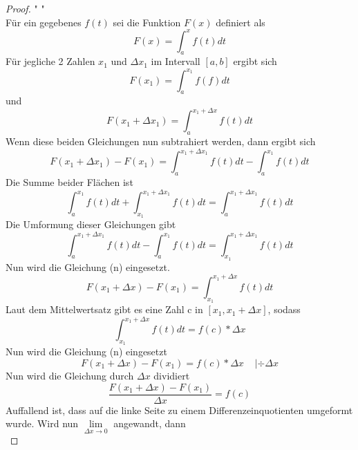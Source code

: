 \documentclass[fontsize=12pt,paper=a4,DIV12,cleardoublepage=empty, 
liststotoc,idxtotoc,bibtotoc]{article}
\theoremstyle{plain}
\theoremstyle{definition}
\begin{document}
	
	\begin{proof}" "\\
	
		Für ein gegebenes $f(t)$ sei die Funktion $F(x)$ definiert als
		\begin{equation}
			F(x)=\int_{a}^{x}f(t)dt
		\end{equation}
		Für jegliche 2 Zahlen $x_1$ und $\Delta x_1$ im Intervall $[a, b]$ ergibt sich
		\begin{equation}
			F(x_1)=\int_{a}^{x_1}f(f)dt
		\end{equation}
		und
		\begin{equation}
			F(x_1+\Delta x_1)=\int_{a}^{x_1+\Delta x}f(t)dt
		\end{equation}
		Wenn diese beiden Gleichungen nun subtrahiert werden, dann ergibt sich
		\begin{equation}
			F(x_1+\Delta x_1)-F(x_1)=\int_{a}^{x_1+\Delta x_1}f(t)dt-\int_{a}^{x_1}f(t)dt
		\end{equation}
		Die Summe beider Flächen ist
		\begin{equation}
			\int_{a}^{x_1}f(t)dt + \int_{x_1}^{x_1+\Delta x_1}f(t)dt = \int_{a}^{x_1+\Delta x_1}f(t)dt
		\end{equation}
		Die Umformung dieser Gleichungen gibt
		\begin{equation}
			\int_{a}^{x_1+\Delta x_1}f(t)dt-\int_{a}^{x_1}f(t)dt=\int_{x_1}^{x_1+\Delta x_1}f(t)dt
		\end{equation}
		Nun wird die Gleichung (n) eingesetzt.
		\begin{equation}
			F(x_1+\Delta x)-F(x_1)=\int_{x_1}^{x_1+\Delta x}f(t)dt
		\end{equation}
		Laut dem Mittelwertsatz gibt es eine Zahl c in $[x_1, x_1+\Delta x]$, sodass
		\begin{equation}
			\int_{x_1}^{x_1+\Delta x}f(t)dt=f(c)*\Delta x
		\end{equation}
		Nun wird die Gleichung (n) eingesetzt
		\begin{equation}
			F(x_1+\Delta x)-F(x_1)=f(c)*\Delta x \;\;\;\;|\div \Delta x
		\end{equation}
		Nun wird die Gleichung durch $\Delta x$ dividiert
		\begin{equation}
			\frac{F(x_1+\Delta x)-F(x_1)}{\Delta x}=f(c)
		\end{equation}
		Auffallend ist, dass auf die linke Seite zu einem Differenzeinquotienten umgeformt wurde. Wird nun $\lim \limits_{\Delta x \to 0}$ angewandt, dann
		\begin{equation}

\end{equation}
\end{proof}
\end{document}
